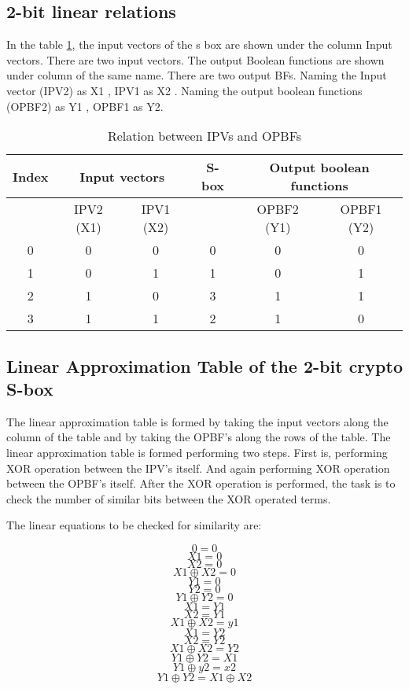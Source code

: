 \documentclass[12pt]{article}
\begin{document}
\subsection{2-bit linear relations}
In the table \ref{table:3}, the input vectors of the s box are shown under the column Input vectors. There are two input vectors. The output Boolean functions are shown under column of the same name. There are two output BFs. Naming the Input vector (IPV2) as X1 ,  IPV1 as X2 . Naming the output boolean functions (OPBF2) as Y1 , OPBF1 as Y2. 
\begin{table}[H]
    \centering
    \begin{tabular}{|c|c|c|c|c|c|}
        \hline
        Index & \multicolumn{2}{|c|}{Input vectors} & S-box & \multicolumn{2}{|c|}{Output boolean functions} \\
        \hline
        & IPV2 (X1) & IPV1 (X2) & & OPBF2 (Y1) & OPBF1 (Y2) \\
        \hline
        0 & 0 & 0 & 0 & 0 & 0 \\
        \hline
        1 & 0 & 1 & 1 & 0 & 1 \\
        \hline
        2 & 1 & 0 & 3 & 1 & 1 \\
        \hline
        3 & 1 & 1 & 2 & 1 & 0 \\
        \hline
    \end{tabular}
    \caption{Relation between IPVs and OPBFs}
    \label{table:3}
\end{table}
\subsection{Linear Approximation Table of the 2-bit crypto S-box}
The linear approximation table is formed by taking the input vectors along the column of the table and by taking the OPBF’s along the rows of the table. The linear approximation table is formed performing two steps. First is, performing XOR operation between the IPV’s itself. And again performing XOR operation between the OPBF’s itself. After the XOR operation is performed, the task is to check the number of similar bits between the XOR operated terms.  

The linear equations to be checked for similarity are: 

$$ 0=0 $$ 
$$ X1=0 $$
$$ X2=0 $$
$$ X1 \oplus X2=0 $$
$$ Y1=0 $$
$$ Y2=0 $$
$$ Y1 \oplus Y2=0 $$ 
$$ X1=Y1 $$
$$ X2=Y1 $$
$$ X1 \oplus X2=y1 $$
$$ X1=Y2 $$
$$ X2=Y2 $$
$$ X1 \oplus X2=Y2 $$
$$ Y1 \oplus Y2=X1 $$ 
$$ Y1 \oplus y2=x2 $$
$$ Y1 \oplus Y2=X1 \oplus X2 $$
\end{document}
